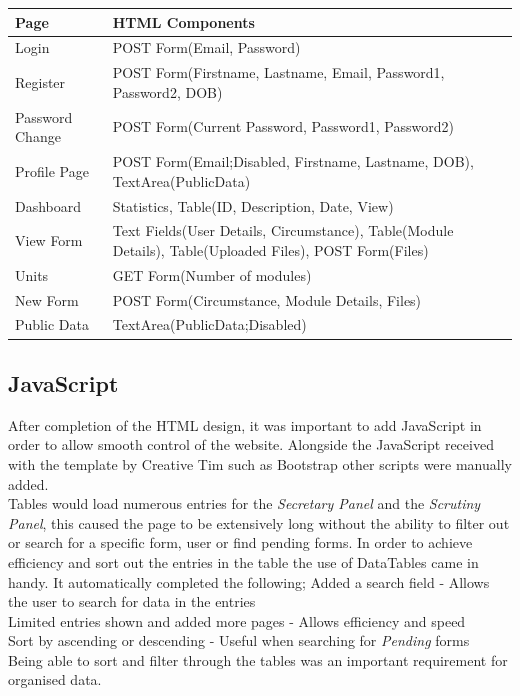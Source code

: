 \documentclass[../main.tex]{subfiles}
\begin{document}
\bgroup
\def\arraystretch{2}%
\begin{table}[H]
\centering
\begin{tabular}{|l| p{9cm} |}
\hline
\textbf{Page} & \textbf{HTML Components} \\ \hline
Login & POST Form(Email, Password) \\ \hline
Register & POST Form(Firstname, Lastname, Email, Password1, Password2, DOB) \\ \hline
Password Change & POST Form(Current Password, Password1, Password2) \\ \hline
Profile Page & POST Form(Email;Disabled, Firstname, Lastname, DOB), TextArea(PublicData) \\ \hline
Dashboard & Statistics, Table(ID, Description, Date, View) \\ \hline
View Form & Text Fields(User Details, Circumstance), Table(Module Details), Table(Uploaded Files), POST Form(Files) \\ \hline
Units & GET Form(Number of modules) \\ \hline
New Form & POST Form(Circumstance, Module Details, Files) \\ \hline
Public Data & TextArea(PublicData;Disabled) \\ \hline
\end{tabular}%
\label{tab:htmlcom} 
\end{table}
\egroup

\subsection{JavaScript}
After completion of the HTML design, it was important to add JavaScript in order to allow smooth control of the website. Alongside the JavaScript received with the template by Creative Tim\cite{creativeTimTemplate} such as Bootstrap\cite{bootstrapfour} other scripts were manually added.  \\[4mm]

Tables would load numerous entries for the \textit{Secretary Panel} and the \textit{Scrutiny Panel}, this caused the page to be extensively long without the ability to filter out or search for a specific form, user or find pending forms. In order to achieve efficiency and sort out the entries in the table the use of DataTables\cite{datatables} came in handy. It automatically completed the following;
Added a search field - Allows the user to search for data in the entries\\
Limited entries shown and added more pages - Allows efficiency and speed\\
Sort by ascending or descending - Useful when searching for \textit{Pending} forms \\
Being able to sort and filter through the tables was an important requirement for organised data. \\[4mm]
\end{document}
